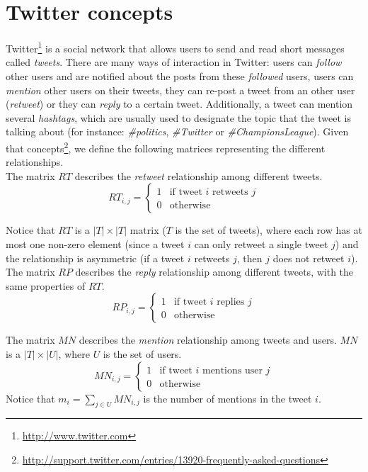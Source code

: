 \section{Twitter concepts}
Twitter\footnote{\url{http://www.twitter.com}} is a social network that allows users to send and read short messages called \emph{tweets}. There are many ways of interaction in Twitter: users can \emph{follow} other users and are notified about the posts from these \emph{followed} users, users can \emph{mention} other users on their tweets, they can re-post a tweet from an other user (\emph{retweet}) or they can \emph{reply} to a certain tweet. Additionally, a tweet can mention several \emph{hashtags}, which are usually used to designate the topic that the tweet is talking about (for instance: \emph{\#politics}, \emph{\#Twitter} or \emph{\#ChampionsLeague}). Given that concepts\footnote{\url{http://support.twitter.com/entries/13920-frequently-asked-questions}}, we define the following matrices representing the different relationships. \\

The matrix $RT$ describes the \emph{retweet} relationship among different tweets. 
\begin{equation}\label{eq:retweet_rel}
RT_{i,j} = \begin{cases}
1 & \text{if tweet } i \text{ retweets } j \\
0 & \text{otherwise}
\end{cases}
\end{equation}

Notice that $RT$ is a $|T| \times |T|$ matrix ($T$ is the set of tweets), where each row has at most one non-zero element (since a tweet $i$ can only retweet a single tweet $j$) and the relationship is asymmetric (if a tweet $i$ retweets $j$, then $j$ does not retweet $i$). \\

The matrix $RP$ describes the \emph{reply} relationship among different tweets, with the same properties of $RT$.
\begin{equation}\label{eq:reply_rel}
RP_{i,j} = \begin{cases}
1 & \text{if tweet } i \text{ replies } j \\
0 & \text{otherwise}
\end{cases}
\end{equation}

The matrix $MN$ describes the \emph{mention} relationship among tweets and users. $MN$ is a $|T| \times |U|$, where $U$ is the set of users. 
\begin{equation}\label{eq:mention_rel}
MN_{i,j} = \begin{cases}
1 & \text{if tweet } i \text{ mentions user } j \\
0 & \text{otherwise}
\end{cases}
\end{equation}
Notice that $m_i = \sum_{j \in U} MN_{i,j}$ is the number of mentions in the tweet $i$. \\

